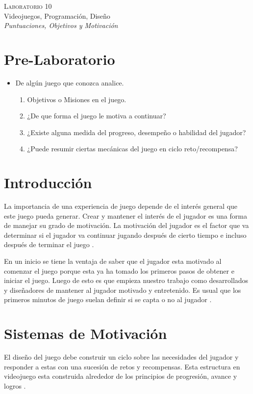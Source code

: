 \begin{center}
\textsc{\Large Laboratorio 10}~\\
{\large Videojuegos, Programación, Diseño}~\\
\emph{Puntuaciones, Objetivos y Motivación}
\end{center}

\section{Pre-Laboratorio}
\begin{itemize}
\item De algún juego que conozca analice.
\begin{enumerate}
  \item Objetivos o Misiones en el juego.
  \item ¿De que forma el juego le motiva a continuar?
  \item ¿Existe alguna medida del progreso, desempeño o habilidad del jugador?
  \item ¿Puede resumir ciertas mecánicas del juego en ciclo reto/recompensa?
\end{enumerate}
\end{itemize}

\section{Introducción}
La importancia de una experiencia de juego depende de el interés general que este juego pueda generar. Crear y mantener el interés de el jugador es una forma de manejar su grado de motivación. La motivación del jugador es el factor que va determinar si el jugador va continuar jugando después de cierto tiempo e incluso después de terminar el juego \cite[p.~75]{jenkinscreatinggames}.

En un inicio se tiene la ventaja de saber que el jugador esta motivado al comenzar el juego porque esta ya ha tomado los primeros pasos de obtener e iniciar el juego. Luego de esto es que empieza nuestro trabajo como desarrollados y diseñadores de mantener al jugador motivado y entretenido. Es usual que los primeros minutos de juego suelan definir si se capta o no al jugador \cite{motivationdesign}.
\section{Sistemas de Motivación}
El diseño del juego debe construir un ciclo sobre las necesidades del jugador y responder a estas con una sucesión de retos y recompensas. Esta estructura en videojuego esta construida alrededor de los principios de progresión, avance y logros \cite{motivationdesign}.


